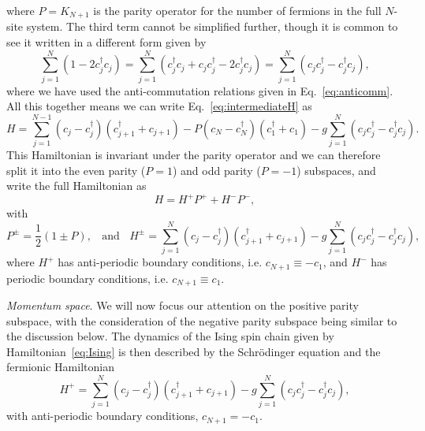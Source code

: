 where $P=K_{N+1}$ is the parity operator for the number of fermions in the full $N$-site system. The third term cannot be simplified further, though it is common to see it written in a different form given by
\begin{equation}
\sum_{j=1}^{N} \left( 1 - 2 c_j^\dagger c_j \right) = \sum_{j=1}^{N} \left( c_j^\dagger c_j + c_j c_j^\dagger - 2 c_j^\dagger c_j \right) = \sum_{j=1}^{N} \left( c_j c_j^\dagger - c_j^\dagger c_j \right),
\end{equation}
where we have used the anti-commutation relations given in Eq.~\eqref{eq:anticomm}. All this together means we can write Eq.~\eqref{eq:intermediateH} as
\begin{equation}
H = \sum_{j=1}^{N-1} \left( c_j - c_j^\dagger \right) \left( c_{j+1}^\dagger + c_{j+1} \right) - P \left( c_N - c_N^\dagger \right) \left( c_{1}^\dagger + c_{1} \right) -g \sum_{j=1}^{N} \left( c_j c_j^\dagger - c_j^\dagger c_j \right).
\end{equation}
This Hamiltonian is invariant under the parity operator and we can therefore split it into the even parity ($P=1$) and odd parity ($P=-1$) subspaces, and write the full Hamiltonian as
\begin{equation}
H = H^+ P^+ + H^- P^-,
\end{equation}
with
\begin{equation}
P^\pm = \frac{1}{2} \left( 1 \pm P \right),~~~~\text{and}~~~~ H^\pm = \sum_{j=1}^{N} \left( c_j - c_j^\dagger \right) \left( c_{j+1}^\dagger + c_{j+1} \right) - g \sum_{j=1}^{N} \left( c_j c_j^\dagger - c_j^\dagger c_j \right), 
\end{equation}
where $H^+$ has anti-periodic boundary conditions, i.e. $c_{N+1} \equiv - c_1$, and $H^-$ has periodic boundary conditions, i.e. $c_{N+1} \equiv c_1$.

\emph{Momentum space}. We will now focus our attention on the positive parity subspace, with the consideration of the negative parity subspace being similar to the discussion below. The dynamics of the Ising spin chain given by Hamiltonian~\eqref{eq:Ising} is then described by the Schr\"odinger equation and the fermionic Hamiltonian 
\begin{equation}
H^+ = \sum_{j=1}^{N} \left( c_j - c_j^\dagger \right) \left( c_{j+1}^\dagger + c_{j+1} \right) - g \sum_{j=1}^{N} \left( c_j c_j^\dagger - c_j^\dagger c_j \right),
\end{equation}
with anti-periodic boundary conditions, $c_{N+1}=-c_1$. 

